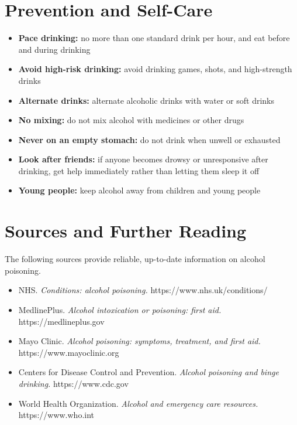 \section*{Prevention and Self-Care}
\begin{itemize}
    \item \textbf{Pace drinking:} no more than one standard drink per hour, and eat before and during drinking
    \item \textbf{Avoid high-risk drinking:} avoid drinking games, shots, and high-strength drinks
    \item \textbf{Alternate drinks:} alternate alcoholic drinks with water or soft drinks
    \item \textbf{No mixing:} do not mix alcohol with medicines or other drugs
    \item \textbf{Never on an empty stomach:} do not drink when unwell or exhausted
    \item \textbf{Look after friends:} if anyone becomes drowsy or unresponsive after drinking, get help immediately rather than letting them sleep it off
    \item \textbf{Young people:} keep alcohol away from children and young people
\end{itemize}

\section*{Sources and Further Reading}
The following sources provide reliable, up-to-date information on alcohol poisoning.

\begin{itemize}
    \item NHS. \textit{Conditions: alcohol poisoning.} https://www.nhs.uk/conditions/
    \item MedlinePlus. \textit{Alcohol intoxication or poisoning: first aid.} https://medlineplus.gov
    \item Mayo Clinic. \textit{Alcohol poisoning: symptoms, treatment, and first aid.} https://www.mayoclinic.org
    \item Centers for Disease Control and Prevention. \textit{Alcohol poisoning and binge drinking.} https://www.cdc.gov
    \item World Health Organization. \textit{Alcohol and emergency care resources.} https://www.who.int
\end{itemize}
